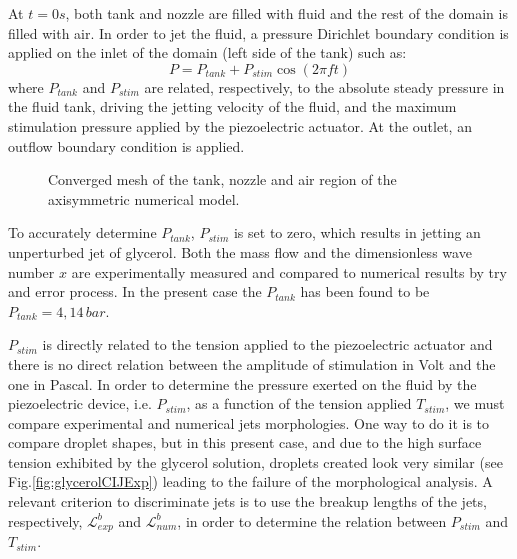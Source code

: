 \documentclass[onecolumn, 12pt]{asme2ej}
\begin{document}
At $t=0s$, both tank and nozzle are filled with fluid and the rest of the domain is filled with air. In order to jet the fluid, a pressure Dirichlet boundary condition is applied on the inlet of the domain (left side of the tank) such as:
\begin{equation} \label{eq:plim}
    P=P_{tank}+P_{stim}\cos(2\pi f t)
\end{equation}
where $P_{tank}$ and $P_{stim}$ are related, respectively, to the absolute steady pressure in the fluid tank, driving the jetting velocity of the fluid, and the maximum stimulation pressure applied by the piezoelectric actuator. At the outlet, an outflow boundary condition is applied.
\begin{figure}[H]
    \centering    
    \caption{Converged mesh of the tank, nozzle and air region of the axisymmetric numerical model.} 
    \label{fig:meshGlycerol}
\end{figure}

To accurately determine $P_{tank}$, $P_{stim}$ is set to zero, which results in jetting an unperturbed jet of glycerol. Both the mass flow and the dimensionless wave number $x$ are experimentally measured and compared to numerical results by try and error process. In the present case the $P_{tank}$ has been found to be $P_{tank}=4,14 \, bar$. 


$P_{stim}$ is directly related to the tension applied to the piezoelectric actuator and there is no direct relation between the amplitude of stimulation in Volt and the one in Pascal. In order to determine the pressure exerted on the fluid by the piezoelectric device, i.e. $P_{stim}$, as a function of the tension applied $T_{stim}$, we must compare experimental and numerical jets morphologies. One way to do it is to compare droplet shapes, but in this present case, and due to the high surface tension exhibited by the glycerol solution, droplets created look very similar (see Fig.\ref{fig:glycerolCIJExp}) leading to the failure of the morphological analysis. A relevant criterion to discriminate jets is to use the breakup lengths of the jets, respectively, $\mathcal{L}_{exp}^b$ and $\mathcal{L}_{num}^b$, in order to determine the relation between $P_{stim}$ and $T_{stim}$. 
\end{document}
